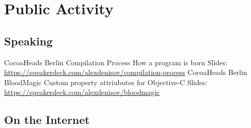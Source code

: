 \documentclass[11pt,a4paper]{moderncv}
\begin{document}
\section{Public Activity}
  \subsection{Speaking}
  \cventry
    {CocoaHeads Berlin}
    {Compilation Process}
    {How a program is born}
    {}{}
    {Slides: \url{https://speakerdeck.com/alexdenisov/compilation-process}}
  \cventry
    {CocoaHeads Berlin}
    {BloodMagic}
    {Custom property attriubutes for Objective-C}
    {}{}
    {Slides: \url{https://speakerdeck.com/alexdenisov/bloodmagic}}
  \subsection{On the Internet}
\end{document}
